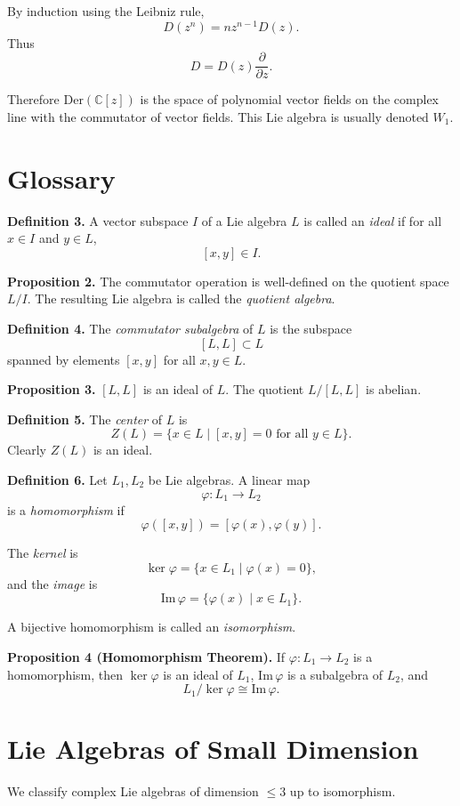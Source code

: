 By induction using the Leibniz rule,
\[
D(z^n) = n z^{n-1} D(z).
\]
Thus
\[
D = D(z)\frac{\partial}{\partial z}.
\]

Therefore $\mathrm{Der}(\mathbb{C}[z])$ is the space of polynomial vector fields
on the complex line with the commutator of vector fields.
This Lie algebra is usually denoted $W_1$.

\section*{Glossary}

\textbf{Definition 3.}
A vector subspace $I$ of a Lie algebra $L$ is called an \emph{ideal} if
for all $x \in I$ and $y \in L$,
\[
[x,y] \in I.
\]

\textbf{Proposition 2.}
The commutator operation is well-defined on the quotient space $L/I$.
The resulting Lie algebra is called the \emph{quotient algebra}.

\textbf{Definition 4.}
The \emph{commutator subalgebra} of $L$ is the subspace
\[
[L,L] \subset L
\]
spanned by elements $[x,y]$ for all $x,y \in L$.

\textbf{Proposition 3.}
$[L,L]$ is an ideal of $L$. The quotient $L/[L,L]$ is abelian.

\textbf{Definition 5.}
The \emph{center} of $L$ is
\[
Z(L) = \{x \in L \mid [x,y] = 0 \text{ for all } y \in L \}.
\]
Clearly $Z(L)$ is an ideal.

\textbf{Definition 6.}
Let $L_1, L_2$ be Lie algebras. A linear map
\[
\varphi: L_1 \to L_2
\]
is a \emph{homomorphism} if
\[
\varphi([x,y]) = [\varphi(x),\varphi(y)].
\]

The \emph{kernel} is
\[
\ker\varphi = \{x \in L_1 \mid \varphi(x)=0\},
\]
and the \emph{image} is
\[
\mathrm{Im}\,\varphi = \{\varphi(x) \mid x \in L_1\}.
\]

A bijective homomorphism is called an \emph{isomorphism}.

\textbf{Proposition 4 (Homomorphism Theorem).}
If $\varphi: L_1 \to L_2$ is a homomorphism, then
$\ker\varphi$ is an ideal of $L_1$,
$\mathrm{Im}\,\varphi$ is a subalgebra of $L_2$, and
\[
L_1/\ker\varphi \cong \mathrm{Im}\,\varphi.
\]

\section*{Lie Algebras of Small Dimension}

We classify complex Lie algebras of dimension $\le 3$ up to isomorphism.

